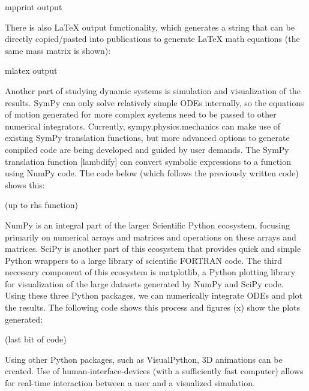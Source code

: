 \documentclass[twocolumn,10pt]{asme2e}
\begin{document}
mpprint output

There is also LaTeX output functionality, which generates a string that can be
directly copied/pasted into publications to generate LaTeX math equations (the
same mass matrix is shown):

mlatex output

Another part of studying dynamic systems is simulation and visualization of the
results.
SymPy can only solve relatively simple ODEs internally, so the equations of
motion generated for more complex systems need to be passed to other numerical
integrators.
Currently, sympy.physics.mechanics can make use of existing SymPy translation
functions, but more advanced options to generate compiled code are being
developed and guided by user demands.
The SymPy translation function [lambdify] can convert symbolic expressions to a
function using NumPy code.
The code below (which follows the previously written code) shows this:

(up to rhs function)

NumPy is an integral part of the larger Scientific Python ecosystem, focusing
primarily on numerical arrays and matrices and operations on these arrays and
matrices.
SciPy is another part of this ecosystem that provides quick and simple Python
wrappers to a large library of scientific FORTRAN code.
The third necessary component of this ecosystem is matplotlib, a Python
plotting library for visualization of the large datasets generated by NumPy and
SciPy code.
Using these three Python packages, we can numerically integrate ODEs and plot
the results.
The following code shows this process and figures (x) show the plots generated:

(last bit of code)

Using other Python packages, such as VisualPython, 3D animations can be
created.
Use of human-interface-devices (with a sufficiently fast computer) allows for
real-time interaction between a user and a visualized simulation.
\end{document}
